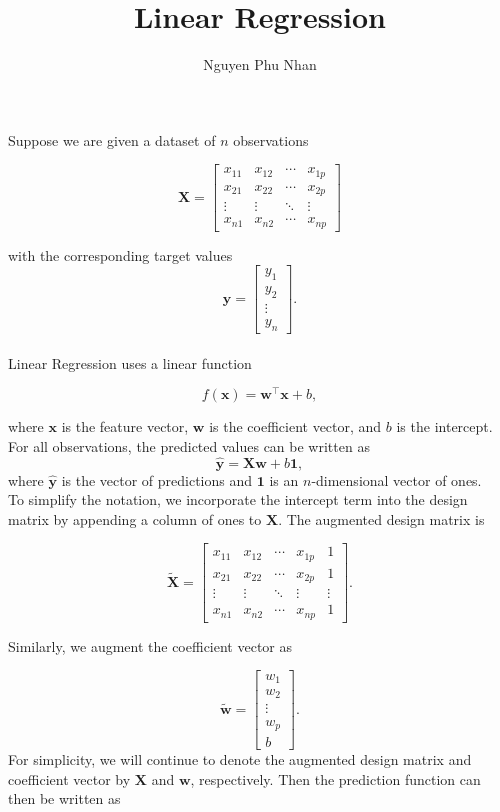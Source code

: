 \documentclass[14pt]{extarticle}
\title{Linear Regression}
\author{Nguyen Phu Nhan}
\date{}
\begin{document}
\maketitle
Suppose we are given a dataset of $n$ observations

\[
\mathbf{X} =
\begin{bmatrix}
x_{11} & x_{12} & \cdots & x_{1p} \\
x_{21} & x_{22} & \cdots & x_{2p} \\
\vdots & \vdots & \ddots & \vdots \\
x_{n1} & x_{n2} & \cdots & x_{np}
\end{bmatrix}
\]

with the corresponding target values
\[
\mathbf{y} = 
\begin{bmatrix}
y_1 \\
y_2 \\
\vdots \\
y_n
\end{bmatrix}.
\]
\\
Linear Regression uses a linear function

\[
f(\mathbf{x}) = \mathbf{w}^\top\mathbf{x} + b,
\]

where $\mathbf{x}$ is the feature vector, $\mathbf{w}$ is the coefficient vector, and $b$ is the intercept. \\

For all observations, the predicted values can be written as
\[
\hat{\mathbf{y}} = \mathbf{X}\mathbf{w} + b\mathbf{1},
\]
where $\hat{\mathbf{y}}$ is the vector of predictions and $\mathbf{1}$ is an $n$-dimensional vector of ones. \\

To simplify the notation, we incorporate the intercept term into the design matrix by appending a column of ones to $\mathbf{X}$. The augmented design matrix is

\[
\tilde{\mathbf{X}}
=
\begin{bmatrix}
x_{11} & x_{12} & \cdots & x_{1p} & 1 \\
x_{21} & x_{22} & \cdots & x_{2p} & 1 \\
\vdots & \vdots & \ddots & \vdots & \vdots \\
x_{n1} & x_{n2} & \cdots & x_{np} & 1
\end{bmatrix}.
\]

Similarly, we augment the coefficient vector as

\[
\tilde{\mathbf{w}}
=
\begin{bmatrix}
w_1 \\
w_2 \\
\vdots \\
w_p \\
b
\end{bmatrix}.
\]
For simplicity, we will continue to denote the augmented design matrix and coefficient vector by $\mathbf{X}$ and $\mathbf{w}$, respectively. Then the prediction function can then be written as
\end{document}
